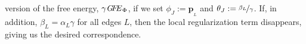 \documentclass[letterpaper]{article} %
\theoremstyle{plain}
\theoremstyle{definition}
\theoremstyle{remark}
\newcommand{\valpha}[1]{#1}
\newcommand\mat[1]{\mathbf{#1}}
\newcommand{\bp}[1][L]{\mat{p}_{\!_{#1}\!}}
\newcommand\GFE{\mathit{G\mkern-4mu F\mkern-4.5mu E}}
\begin{document}
version of the free energy, $\gamma\GFE_\Phi$, 
if we set $\phi_J := \bp$ and $\theta_J := \nicefrac{\beta_L}{\gamma}$.  
If, in addition, $\beta_L = \valpha{\alpha_L}\gamma$ for all
edges $L$, then
the local regularization term disappears, giving us
the desired correspondence. 
\end{document}
